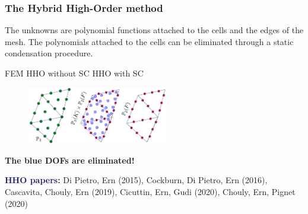 \begin{frame}
  \frametitle{The Hybrid High-Order method}
  The unknowns are polynomial
  functions attached to the cells and the edges of the mesh. The polynomials attached to the cells can be eliminated through a static condensation procedure.
  \begin{center}
\hspace{2 cm} FEM \qquad \qquad HHO without SC \qquad  HHO with SC 
    \end{center}
  \begin{figure}
\includegraphics[width=0.55\textwidth]{HHO_FEM}
  \end{figure}
  \textcolor{cadmiumgreen}{\textbf{The blue DOFs are eliminated!}}
  
   \scriptsize{ \textcolor{midnightblue}{\textbf{HHO papers:}} Di Pietro, Ern (2015), Cockburn, Di Pietro, Ern (2016), Cascavita, Chouly, Ern (2019), Cicuttin, Ern, Gudi (2020), Chouly, Ern, Pignet (2020)}
\end{frame}
